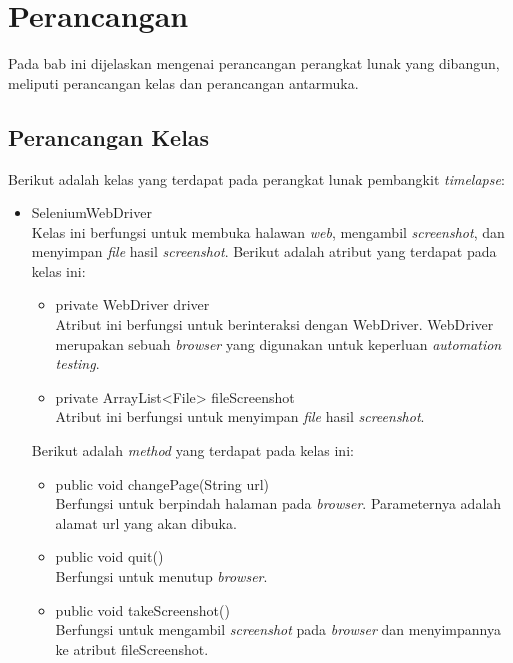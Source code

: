 \chapter{Perancangan}
\label{chap:Perancangan}

Pada bab ini dijelaskan mengenai perancangan perangkat lunak yang dibangun, meliputi perancangan kelas dan perancangan antarmuka.

\section{Perancangan Kelas}
\label{sec:perancangan_kelas}
Berikut adalah kelas yang terdapat pada perangkat lunak pembangkit \textit{timelapse}:
\begin{itemize}
\item SeleniumWebDriver\\
Kelas ini berfungsi untuk membuka halawan \textit{web}, mengambil \textit{screenshot}, dan menyimpan \textit{file} hasil \textit{screenshot}. Berikut adalah atribut yang terdapat pada kelas ini:
\begin{itemize}
   \item private WebDriver driver\\
   Atribut ini berfungsi untuk berinteraksi dengan WebDriver. WebDriver merupakan sebuah \textit{browser} yang digunakan untuk keperluan \textit{automation testing}.
    \item private ArrayList<File> fileScreenshot\\
	Atribut ini berfungsi untuk menyimpan \textit{file} hasil \textit{screenshot}.
\end{itemize}

Berikut adalah \textit{method} yang terdapat pada kelas ini:
\begin{itemize}
   
  \item public void changePage(String url)\\
  Berfungsi untuk berpindah halaman pada \textit{browser}. Parameternya adalah alamat url yang akan dibuka.
  \item public void quit()\\
  Berfungsi untuk menutup \textit{browser}.
  \item public void takeScreenshot()\\
  Berfungsi untuk mengambil \textit{screenshot} pada \textit{browser} dan menyimpannya ke atribut fileScreenshot.
\end{itemize}


\end{itemize}
